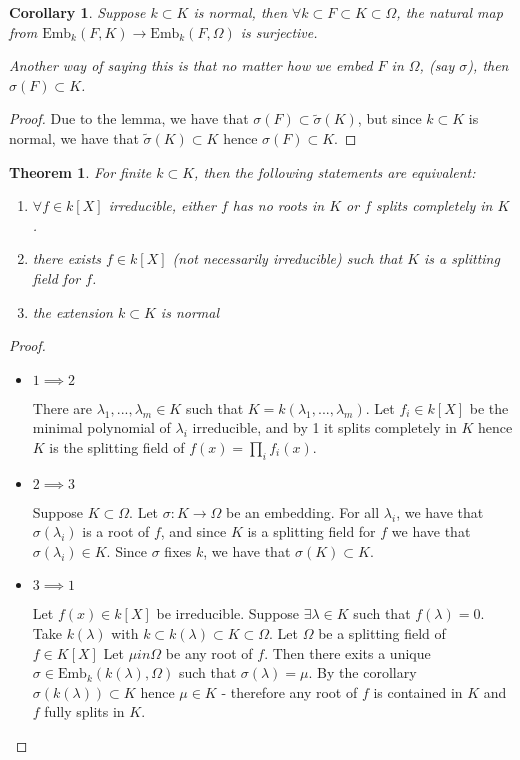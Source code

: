 \documentclass{article}
\theoremstyle{definition}
\theoremstyle{plain}%
\newtheorem{thm}{Theorem}[section]
\newtheorem*{cor}{Corollary}
\theoremstyle{remark}
\newcommand{\Emb}{\text{Emb}}
\begin{document}
\begin{cor}
    Suppose $k \subset K$ is normal, then $\forall k \subset F \subset K \subset \Omega$, the natural map from $\Emb_k(F,K) \to \Emb_k(F, \Omega)$ is surjective.
    
    Another way of saying this is that no matter how we embed $F$ in $\Omega$, (say $\sigma$), then $\sigma(F) \subset K$.
\end{cor}

\begin{proof}
    Due to the lemma, we have that $\sigma(F) \subset \tilde \sigma(K)$, but since $k \subset K$ is normal, we have that $\tilde \sigma(K) \subset K$ hence $\sigma(F) \subset K$.
\end{proof}

\begin{thm}
    For finite $k \subset K$, then the following statements are equivalent:
    \begin{enumerate}
        \item $\forall f \in k[X]$ irreducible, either $f$ has no roots in $K$ or $f$ splits completely in $K$.
        \item there exists $f \in k[X]$ (not necessarily irreducible) such that $K$ is a splitting field for $f$.
        \item the extension $k \subset K$ is normal
    \end{enumerate}
\end{thm}

\begin{proof}
    \hspace{0.1em}
    \begin{itemize}
        \item $1 \implies 2$
        
        There are $\lambda_1, ..., \lambda_m \in K$ such that $K = k(\lambda_1, ..., \lambda_m)$. Let $f_i \in k[X]$ be the minimal polynomial of $\lambda_i$ irreducible, and by 1 it splits completely in $K$ hence $K$ is the splitting field of $f(x) = \prod_i f_i(x)$.
        
        \item $2 \implies 3$
        
        Suppose $K \subset \Omega$. Let $\sigma : K \to \Omega$ be an embedding. For all $\lambda_i$, we have that $\sigma(\lambda_i)$ is a root of $f$, and since $K$ is a splitting field for $f$ we have that $\sigma(\lambda_i) \in K$. Since $\sigma$ fixes $k$, we have that $\sigma(K) \subset K$.
        
        \item $3 \implies 1$
        
        Let $f(x) \in k[X]$ be irreducible. Suppose $\exists \lambda \in K$ such that $f(\lambda) = 0$. Take $k(\lambda)$ with $k \subset k(\lambda) \subset K \subset \Omega$. Let $\Omega$ be a splitting field of $f \in K[X]$ Let $\mu in \Omega$ be any root of $f$. Then there exits a unique $\sigma \in \Emb_k(k(\lambda), \Omega)$ such that $\sigma(\lambda) = \mu$. By the corollary $\sigma(k(\lambda)) \subset K$ hence $\mu \in K$ - therefore any root of $f$ is contained in $K$ and $f$ fully splits in $K$.
    \end{itemize}
\end{proof}
\end{document}

